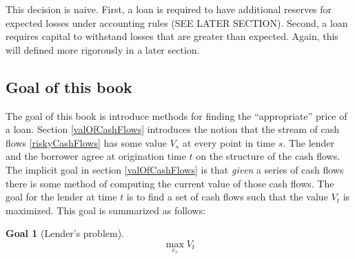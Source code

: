 \documentclass{article}
\theoremstyle{definition}
\newtheorem{goal}{Goal}
\begin{document}
This decision is naive.  First, a loan is required to have additional reserves for expected losses under accounting rules (SEE LATER SECTION).  Second, a loan requires capital to withstand losses that are greater than expected.  Again, this will defined more rigorously in a later section.  

\subsection{Goal of this book}

The goal of this book is introduce methods for finding the ``appropriate'' price of a loan.  Section \ref{valOfCashFlows} introduces the notion that the stream of cash flows \ref{riskyCashFlows} has some value \(V_s\) at every point in time \(s\).  The lender and the borrower agree at origination time \(t\) on the structure of the cash flows.  The implicit goal in section \ref{valOfCashFlows} is that \emph{given} a series of cash flows there is some method of computing the current value of those cash flows.  The goal for the lender at time \(t\) is to find a set of cash flows such that the value \(V_t\) is maximized.  This goal is summarized as follows:

\begin{goal}[Lender's problem] \label{lender1}
	\[\max_{c_s} V_t\]
	
\end{goal}
\end{document}
